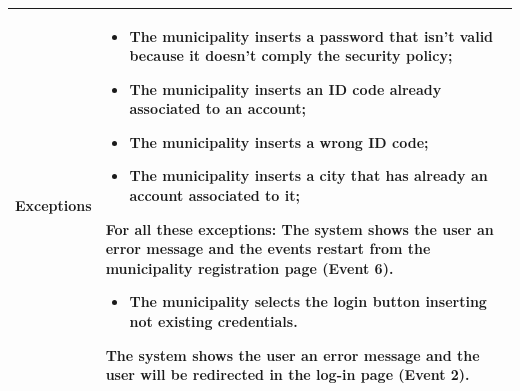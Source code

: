 \documentclass[titlepage]{article}
\begin{document}
\begin{longtable}{| p{3 cm} | p{10 cm} |}
\textbf{Exceptions} & 
\begin{itemize}
	\item The municipality inserts a password that isn't valid because it doesn't comply the security policy;
	\item The municipality inserts an ID code already associated to an account;
	\item The municipality inserts a wrong ID code;
	
	\item The municipality inserts a city that has already an account associated to it;
\end{itemize} 
	
							
For all these exceptions: The system shows the user an error message and the events restart from the municipality registration page (Event 6).


\begin{itemize}
\item The municipality selects the login button inserting not existing credentials.
\end{itemize} 
The system shows the user an error message and the user will be redirected in the log-in page (Event 2).
\\ \hline

\end{longtable}

\newpage
\end{document}
